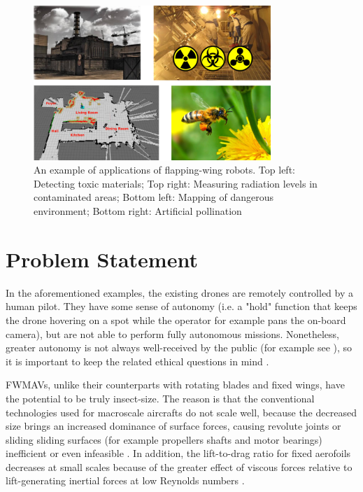 \begin{figure}
\centering
\includegraphics[width=0.8\textwidth]{Files/Figures/applications.png}
\caption[Application examples]{An example of applications of flapping-wing robots. Top left: Detecting toxic materials; Top right: Measuring radiation levels in contaminated areas; Bottom left: Mapping of dangerous environment; Bottom right: Artificial pollination}
\label{fig:application}
\end{figure}


\section{Problem Statement}
\label{sec:application}
In the aforementioned examples, the existing drones are remotely controlled by a human pilot. They have some sense of autonomy (i.e. a "hold" function that keeps the drone hovering on a spot while the operator for example pans the on-board camera), but are not able to perform fully autonomous missions. Nonetheless, greater autonomy is not always well-received by the public (for example see \cite{dailymail}), so it is important to keep the related ethical questions in mind \cite{uavethics} \cite{morallandscape}.

FWMAVs, unlike their counterparts with rotating blades and fixed wings, have the potential to be truly insect-size. The reason is that the conventional technologies used for macroscale aircrafts do not scale well, because the decreased size brings an increased dominance of surface forces, causing revolute joints or sliding sliding surfaces (for example propellers shafts and motor bearings) inefficient or even infeasible \cite{Buck2013}. In addition, the lift-to-drag ratio for fixed aerofoils decreases at small scales because of the greater effect of viscous forces relative to lift-generating inertial forces at low Reynolds numbers \cite{Fuller2014}.

